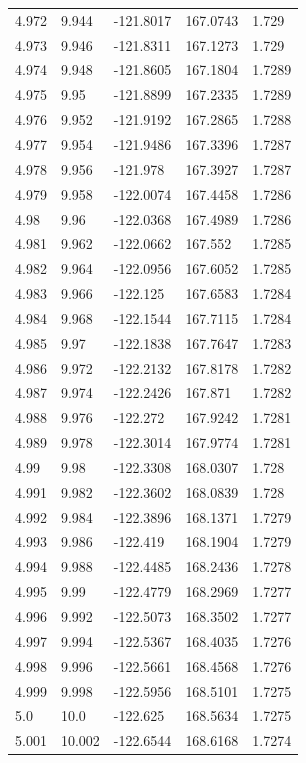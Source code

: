 \begin{tabular}{lllll}
4.972 & 9.944 & -121.8017 & 167.0743 & 1.729 \\
4.973 & 9.946 & -121.8311 & 167.1273 & 1.729 \\
4.974 & 9.948 & -121.8605 & 167.1804 & 1.7289 \\
4.975 & 9.95 & -121.8899 & 167.2335 & 1.7289 \\
4.976 & 9.952 & -121.9192 & 167.2865 & 1.7288 \\
4.977 & 9.954 & -121.9486 & 167.3396 & 1.7287 \\
4.978 & 9.956 & -121.978 & 167.3927 & 1.7287 \\
4.979 & 9.958 & -122.0074 & 167.4458 & 1.7286 \\
4.98 & 9.96 & -122.0368 & 167.4989 & 1.7286 \\
4.981 & 9.962 & -122.0662 & 167.552 & 1.7285 \\
4.982 & 9.964 & -122.0956 & 167.6052 & 1.7285 \\
4.983 & 9.966 & -122.125 & 167.6583 & 1.7284 \\
4.984 & 9.968 & -122.1544 & 167.7115 & 1.7284 \\
4.985 & 9.97 & -122.1838 & 167.7647 & 1.7283 \\
4.986 & 9.972 & -122.2132 & 167.8178 & 1.7282 \\
4.987 & 9.974 & -122.2426 & 167.871 & 1.7282 \\
4.988 & 9.976 & -122.272 & 167.9242 & 1.7281 \\
4.989 & 9.978 & -122.3014 & 167.9774 & 1.7281 \\
4.99 & 9.98 & -122.3308 & 168.0307 & 1.728 \\
4.991 & 9.982 & -122.3602 & 168.0839 & 1.728 \\
4.992 & 9.984 & -122.3896 & 168.1371 & 1.7279 \\
4.993 & 9.986 & -122.419 & 168.1904 & 1.7279 \\
4.994 & 9.988 & -122.4485 & 168.2436 & 1.7278 \\
4.995 & 9.99 & -122.4779 & 168.2969 & 1.7277 \\
4.996 & 9.992 & -122.5073 & 168.3502 & 1.7277 \\
4.997 & 9.994 & -122.5367 & 168.4035 & 1.7276 \\
4.998 & 9.996 & -122.5661 & 168.4568 & 1.7276 \\
4.999 & 9.998 & -122.5956 & 168.5101 & 1.7275 \\
5.0 & 10.0 & -122.625 & 168.5634 & 1.7275 \\
5.001 & 10.002 & -122.6544 & 168.6168 & 1.7274 \\

\end{tabular}
